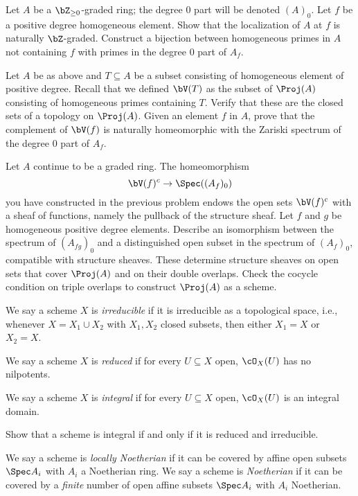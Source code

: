 \begin{homework}[e]
	\prob Let $A$ be a $\bZ_{\geq 0}$-graded ring; the degree 0 part will be denoted $(A)_0$. Let $f$ be a positive degree homogeneous element. Show that the localization of $A$ at $f$ is naturally $\bZ$-graded. Construct a bijection between homogeneous primes in $A$ not containing $f$ with primes in the degree $0$ part of $A_f$.

	\prob Let $A$ be as above and $T \subseteq A$ be a subset consisting of homogeneous element of positive degree. Recall that we defined $\bV(T)$ as the subset of $\Proj(A)$ consisting of homogeneous primes containing $T$. Verify that these are the closed sets of a topology on $\Proj(A)$. Given an element $f$ in $A$, prove that the complement of $\bV(f)$ is naturally homeomorphic with the Zariski spectrum of the degree $0$ part of $A_f$.

	\prob Let $A$ continue to be a graded ring. The homeomorphism
	\[
	\bV(f)^c \to \Spec((A_f)_0)
	\] 
	you have constructed in the previous problem endows the open sets $\bV(f)^c$ with a sheaf of functions, namely the pullback of the structure sheaf. Let $f$ and $g$ be homogeneous positive degree elements. Describe an isomorphism between the spectrum of $(A_{fg})_0$ and a distinguished open subset in the spectrum of $(A_f)_0$, compatible with structure sheaves. These determine structure sheaves on open sets that cover $\Proj(A)$ and on their double overlaps. Check the cocycle condition on triple overlaps to construct $\Proj(A)$ as a scheme.

	 We say a scheme $X$ is \emph{irreducible} if it is irreducible as a topological space, i.e., whenever $X = X_1 \cup X_2$ with $X_1, X_2$ closed subsets, then either $X_1 = X$ or $X_2 = X$.

	\noindent We say a scheme $X$ is \textit{reduced} if for every $U\subseteq X$ open, $\cO_X(U)$ has no nilpotents.

	\noindent We say a scheme $X$ is \textit{integral} if for every $U\subseteq X$ open, $\cO_X(U)$ is an integral domain.

	\noindent Show that a scheme is integral if and only if it is reduced and irreducible.
	
	 We say a scheme is \textit{locally Noetherian} if it can be covered by affine open subsets $\Spec A_i$ with $A_i$ a Noetherian ring. We say a scheme is \textit{Noetherian} if it can be covered by a \textit{finite} number of open affine subsets $\Spec A_i$ with $A_i$ Noetherian.


\end{homework}
